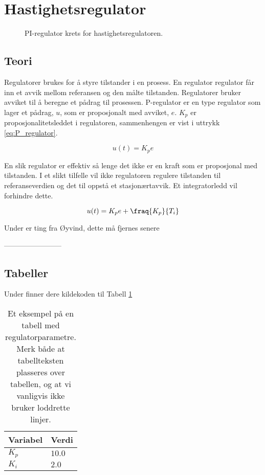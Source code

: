 \section{Hastighetsregulator}\label{sec:hastighetsreg}

\begin{figure}[t]
    \centering
    
    \caption{PI-regulator krets for hastighetsregulatoren.}
    \label{fig:krets_hastighets_regulator}
\end{figure}

\subsection{Teori}

Regulatorer brukes for å styre tilstander i en prosess. En regulator regulator får inn et avvik mellom referansen og den målte tilstanden. Regulatorer bruker avviket til å beregne et pådrag til prosessen. P-regulator er en type regulator som lager et pådrag, $u$,  som er proposjonalt med avviket, $e$. $K_p$ er proposjonalitetsleddet i regulatoren, sammenhengen er vist i uttrykk \ref{eq:P_regulator}.

\begin{equation}
    \label{eq:P_regulator}
    u(t) = K_p e
\end{equation}

En slik regulator er effektiv så lenge det ikke er en kraft som er proposjonal med tilstanden. I et slikt tilfelle vil ikke regulatoren regulere tilstanden til referanseverdien og det til oppstå et stasjonærtavvik. Et integratorledd vil forhindre dette.

\begin{equation}
    \label{eq:PI_regulator}
    u(t) = K_p e + \fraq{K_p}{T_i}
\end{equation}


Under er ting fra Øyvind, dette må fjernes senere

------------------------

\subsection{Tabeller}
Under finner dere kildekoden til Tabell \ref{tab:eksempeltabell}


\begin{table}[tb]
	\centering
	\begin{tabular}{ll} 
		\toprule
		Variabel & Verdi \\
		\midrule
        $K_p$ & $10.0$ \\
        $K_i$ & $2.0$\\
		\bottomrule
	\end{tabular}
    \caption{Et eksempel på en tabell med regulatorparametre. Merk både at tabellteksten plasseres over tabellen, og at vi vanligvis ikke bruker loddrette linjer.}
\label{tab:eksempeltabell}
\end{table}

